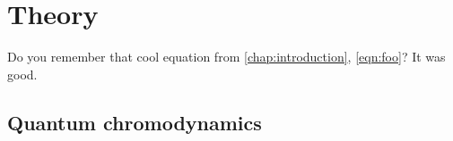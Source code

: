 \chapter{Theory}
\label{chap:theory}

Do you remember that cool equation from \cref{chap:introduction}, 
\cref{eqn:foo}?
It was good.

\lipsum[1-12]

\section{Quantum chromodynamics}
\label{sec:qcd}

\lipsum[1-4]
